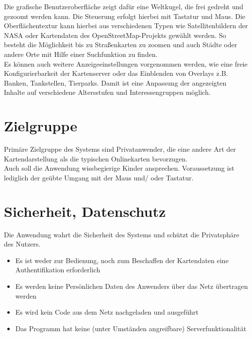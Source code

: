 \documentclass[10pt]{scrreprt}
\begin{document}
Die grafische Benutzeroberfläche zeigt dafür eine Weltkugel, die frei gedreht und gezoomt werden kann. Die Steuerung erfolgt hierbei mit Tastatur und Maus. Die Oberflächentextur kann hierbei aus verschiedenen Typen wie Satellitenbildern der NASA oder Kartendaten des OpenStreetMap-Projekts gewählt werden. 
So besteht die Möglichkeit bis zu Straßenkarten zu zoomen und auch Städte oder andere Orte mit Hilfe einer Suchfunktion zu finden. \\

Es können auch weitere Anzeigeeinstellungen vorgenommen werden, wie eine freie Konfigurierbarkeit der Kartenserver oder das Einblenden von Overlays z.B. Banken, Tankstellen, Tierparks.  
Damit ist eine Anpassung der angezeigten Inhalte auf verschiedene Altersstufen und Interessengruppen möglich.


\section{Zielgruppe}
Primäre Zielgruppe des Systems sind Privatanwender, die eine andere Art der Kartendarstellung als die typischen Onlinekarten bevorzugen. \\

Auch soll die Anwendung wissbegierige Kinder ansprechen. Voraussetzung ist lediglich der geübte Umgang mit der Maus und/ oder Tastatur.

\section{Sicherheit, Datenschutz}
Die Anwendung wahrt die Sicherheit des Systems und schützt die Privatsphäre des Nutzers.
\begin{itemize}
\item Es ist weder zur Bedienung, noch zum Beschaffen der Kartendaten eine Authentifikation erforderlich 
\item Es werden keine Persönlichen Daten des Anwenders über das Netz übertragen werden
\item Es wird kein Code aus dem Netz nachgeladen und ausgeführt
\item Das Programm hat keine (unter Umständen angreifbare) Serverfunktionalität
\end{itemize}
\end{document}
